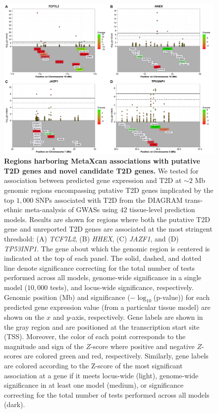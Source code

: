 \documentclass[10pt]{article}
\begin{document}
\begin{figure}
\includegraphics[width=\textwidth]{fig2_locusArray.png}
\caption{\textbf{Regions harboring MetaXcan associations with putative T2D genes and novel candidate T2D genes.} We tested for association between predicted gene expression and T2D at $\sim2$ Mb genomic regions encompassing putative T2D genes implicated by the top $1,000$ SNPs associated with T2D from the DIAGRAM trans-ethnic meta-analysis of GWASs using $42$ tissue-level prediction models. Results are shown for regions where both the putative T2D gene and unreported T2D genes are associated at the most stringent threshold: (A) \textit{TCF7L2}, (B) \textit{HHEX}, (C) \textit{JAZF1}, and (D) \textit{TP53INP1}. The gene about which the genomic region is centered is indicated at the top of each panel. The solid, dashed, and dotted line denote significance correcting for the total number of tests performed across all models, genome-wide significance in a single model ($10,000$ tests), and locus-wide significance, respectively. Genomic position (Mb) and significance ($-\log_{10}$(p-value)) for each predicted gene expression value (from a particular tissue model) are shown on the $x$ and $y$-axis, respectively. Gene labels are shown in the gray region and are positioned at the transcription start site (TSS). Moreover, the color of each point corresponds to the magnitude and sign of the $Z$-score where positive and negative $Z$-scores are colored green and red, respectively. Similarly, gene labels are colored according to the Z-score of the most significant association at a gene if it meets locus-wide (light), genome-wide significance in at least one model (medium), or significance correcting for the total number of tests performed across all models (dark). } 
\label{fig:locus_array_2}
\end{figure}
\end{document}
